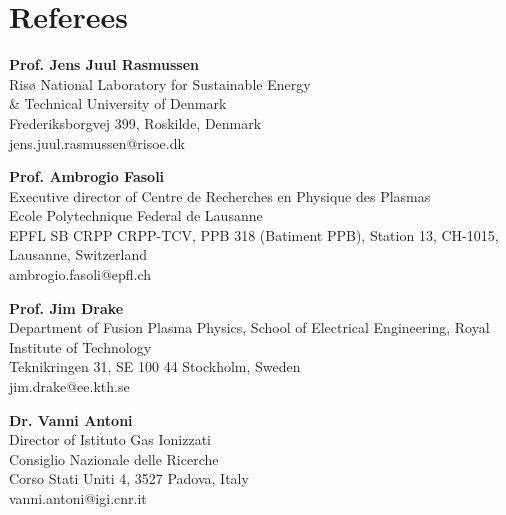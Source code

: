 \section{Referees}

\vspace{.5cm}

\textbf{Prof. Jens Juul Rasmussen} \\
Ris{\o} National Laboratory for Sustainable Energy \\
\& Technical University of Denmark \\
Frederiksborgvej 399, Roskilde, Denmark\\
jens.juul.rasmussen@risoe.dk

\vspace{1cm}

\textbf{Prof. Ambrogio Fasoli}\\
Executive director of Centre de Recherches en Physique des Plasmas \\
Ecole Polytechnique Federal de Lausanne \\
EPFL SB CRPP CRPP-TCV,  PPB 318 (Batiment PPB), Station 13, CH-1015,
Lausanne, Switzerland\\
ambrogio.fasoli@epfl.ch

\vspace{1cm}

\textbf{Prof. Jim Drake}\\
Department of Fusion Plasma Physics, School of Electrical Engineering, Royal Institute of Technology \\
Teknikringen 31, SE 100 44 Stockholm, Sweden \\
jim.drake@ee.kth.se

\vspace{1cm}

\textbf{Dr. Vanni Antoni}\\
Director of Istituto Gas Ionizzati \\
Consiglio Nazionale delle Ricerche \\
Corso Stati Uniti 4, 3527 Padova, Italy \\
vanni.antoni@igi.cnr.it
